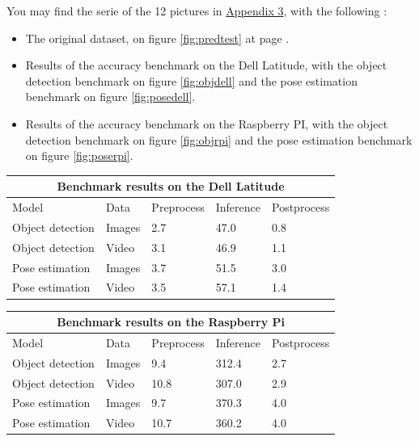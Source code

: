 \documentclass[12pt]{article}
\begin{document}
You may find the serie of the 12 pictures in \hyperref[sec:accuracy]{Appendix 3}, with the following :
\begin{itemize}
  \item The original dataset, on figure \ref{fig:predtest} at page \pageref{fig:predtest}.
  \item Results of the accuracy benchmark on the Dell Latitude, with the object detection benchmark on figure \ref{fig:objdell} and the pose estimation benchmark on figure \ref{fig:posedell}.
  \item Results of the accuracy benchmark on the Raspberry PI, with the object detection benchmark on figure \ref{fig:objrpi} and the pose estimation benchmark on figure \ref{fig:poserpi}.
\end{itemize}

\clearpage

\begin{table}
  \centering
  \begin{tabular}{ |p{5cm}|p{1.2cm}|p{2cm}|p{2cm}|p{2cm}|  }
    \hline
    \multicolumn{5}{|c|}{Benchmark results on the Dell Latitude} \\
    \hline
    Model&Data&Preprocess&Inference&Postprocess \\
    \hline
    Object detection&Images&2.7&47.0&0.8 \\
    Object detection&Video&3.1&46.9&1.1 \\
    Pose estimation&Images&3.7&51.5&3.0 \\
    Pose estimation&Video&3.5&57.1&1.4 \\
    \hline
  \end{tabular}
\end{table}

\begin{table}
  \centering
  \begin{tabular}{ |p{5cm}|p{1.2cm}|p{2cm}|p{2cm}|p{2cm}|  }
    \hline
    \multicolumn{5}{|c|}{Benchmark results on the Raspberry Pi} \\
    \hline
    Model&Data&Preprocess&Inference&Postprocess \\
    \hline
    Object detection&Images&9.4&312.4&2.7 \\
    Object detection&Video&10.8&307.0&2.9 \\
    Pose estimation&Images&9.7&370.3&4.0 \\
    Pose estimation&Video&10.7&360.2&4.0 \\
    \hline
  \end{tabular}
\end{table}
\end{document}

